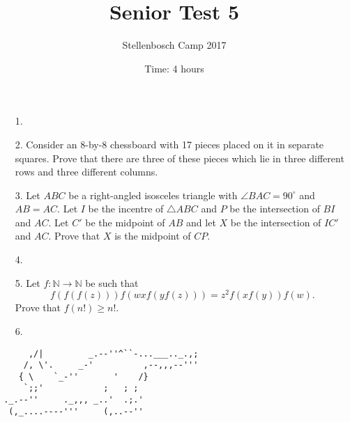 \documentclass[12pt]{article}
\title{Senior Test 5}
\author{Stellenbosch Camp 2017}
\date{Time: 4 hours}
\begin{document}
 \maketitle

\begin{enumerate}

\item[1.] %


\item[2.] %
Consider an 8-by-8 chessboard with 17 pieces placed on it in separate squares. Prove that there are three of these pieces which lie in three different rows and three different columns.


\item[3.] %
Let $ABC$ be a right-angled isosceles triangle with $\angle BAC = 90^\circ$ and $AB = AC$. Let $I$ be the incentre of $\triangle ABC$ and $P$ be the intersection of $BI$ and $AC$. Let $C'$ be the midpoint of $AB$ and let $X$ be the intersection of $IC'$ and $AC$. Prove that $X$ is the midpoint of $CP$.


\item[4.] %
 

\item[5.] %
Let $f : \mathbb{N} \to \mathbb{N}$ be such that
  \[ f(f(f(z))) f(wx f(y f(z))) = z^2 f(xf(y)) f(w) .\]
Prove that $f(n!) \geq n!$.


\item[6.] %


\end{enumerate}

\vfill

\centering
\begin{BVerbatim}
      ,/|         _.--''^``-...___.._.,;
     /, \'.     _-'          ,--,,,--'''
    { \    `_-''       '    /}
     `;;'            ;   ; ;
 ._.--''     ._,,, _..'  .;.'
  (,_....----'''     (,..--''
\end{BVerbatim}
\end{document}
